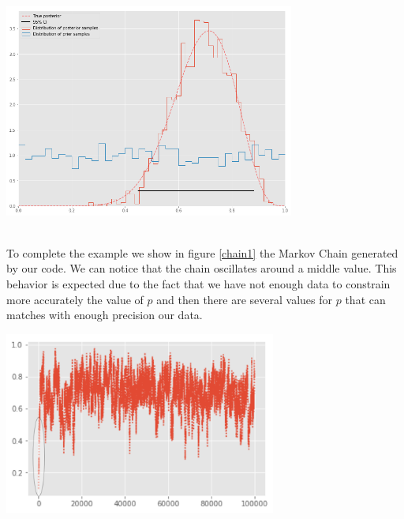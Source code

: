 \documentclass[onecolumn,           %
               showpacs,            %
               preprintnumbers,     %
               aps,                 %
               prl,          	    %
               letterpaper,             %
               superscriptaddress,      %
               nofootinbib,         %
               tightenlines,        %
               floats,floatfix      %
               ,usenatbib,
               ]{revtex4-1}
\begin{document}
\begin{minipage}{\textwidth}
\centering

\includegraphics[height=7cm]{Figures/posterior.png}
\label{posteriord}
\end{minipage}\\

To complete the example we show in figure \ref{chain1} the Markov Chain generated by our code. We can notice that the chain oscillates around a middle value. This behavior is expected due to the fact that we have not enough data to constrain more accurately the value of $p$ and then there are several values for $p$ that can matches with enough precision our data.   

\begin{minipage}{\textwidth}
\centering
\includegraphics[height=6cm]{Figures/chain1.png}
\label{chain1}
\end{minipage}\\ $ $ \\
\end{document}
